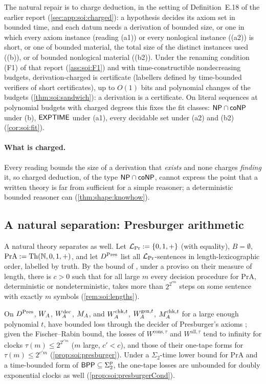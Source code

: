 The natural repair is to charge deduction, in the setting of Definition~E.18 of the earlier report (\cref{sec:app:soi:charged}): a hypothesis decides its axiom set in bounded time, and each datum needs a derivation of bounded size, or one in which every axiom instance (reading (a1)) or every nonlogical instance ((a2)) is short, or one of bounded material, the total size of the distinct instances used ((b)), or of bounded nonlogical material ((b2)). Under the renaming condition (F1) of that report (\cref{ass:soi:F1}) and with time-constructible nondecreasing budgets, derivation-charged \SAIabbr is certificate \SOIabbr (labellers defined by time-bounded verifiers of short certificates), up to $O(1)$ bits and polynomial changes of the budgets (\cref{thm:soi:sandwich}): a derivation is a certificate. On literal sequences at polynomial budgets with charged degrees this fixes the fit classes: $\mathsf{NP}\cap\mathsf{coNP}$ under (b), $\mathsf{EXPTIME}$ under (a1), every decidable set under (a2) and (b2) (\cref{cor:soi:fit}).

\paragraph{What is charged.}\label{rem:soi:whatcharged} Every reading bounds the size of a derivation that \emph{exists} and none charges \emph{finding} it, so charged deduction, of the type $\mathsf{NP}\cap\mathsf{coNP}$, cannot express the point that a written theory is far from sufficient for a simple reasoner; a deterministic bounded reasoner can (\cref{thm:shape:knowhow}).

\subsection{A natural separation: Presburger arithmetic}\label{sec:soi:presburger}

A natural theory separates as well. Let $\mathcal L_{\rm Pr}:=\{0,1,+\}$ (with equality), $B=\emptyset$, $\mathrm{PrA}:=\mathrm{Th}(\mathbb N,0,1,+)$, and let $D^{\rm Pres}$ list all $\mathcal L_{\rm Pr}$-sentences in length-lexicographic order, labelled by truth. By the bound of \citet{fischer1974super}, under a proviso on their measure of length, there is $c>0$ such that for all large $m$ every decision procedure for $\mathrm{PrA}$, deterministic or nondeterministic, takes more than $2^{2^{cm}}$ steps on some sentence with exactly $m$ symbols (\cref{rem:soi:lengths}).

On $D^{\rm Pres}$, $W_{A}$, $W_{A}^{\mathrm{dec}}$, $M_{A}$, and $W_{A}^{\mathrm{chk},t}$, $W_{A}^{\mathrm{gen},t}$, $M_{A}^{\mathrm{chk},t}$ for a large enough polynomial $t$, have bounded loss through the decider of Presburger's axioms \citep{presburger1929vollstandigkeit}; given the Fischer--Rabin bound, the losses of $W^{\mathrm{cons},\tau}$ and $W^{\mathrm{all},\tau}$ tend to infinity for clocks $\tau(m)\le2^{2^{c'm}}$ ($m$ large, $c'<c$), and those of their one-tape forms for $\tau(m)\le2^{c'm}$ (\cref{prop:soi:presburger}). Under a $\Sigma_2$-time lower bound for $\mathrm{PrA}$ and a time-bounded form of $\mathsf{BPP}\subseteq\Sigma_2^p$, the one-tape losses are unbounded for doubly exponential clocks as well (\cref{prop:soi:presburgerCond}).


